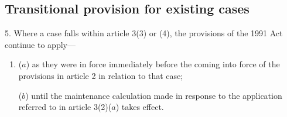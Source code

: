 \documentclass[12pt,a4paper]{article}
\begin{document}
\subsection[5. Transitional provision for existing cases]{Transitional provision for existing cases}

5.  Where a case falls within article 3(3) or (4), the provisions of the 1991 Act continue to apply—
\begin{enumerate}\item[]
($a$) as they were in force immediately before the coming into force of the provisions in article 2 in relation to that case;

($b$) until the maintenance calculation made in response to the application referred to in article 3(2)($a$)  takes effect.
\end{enumerate}


%
%
%
%

\bigskip

\pagebreak[3]
\end{document}
